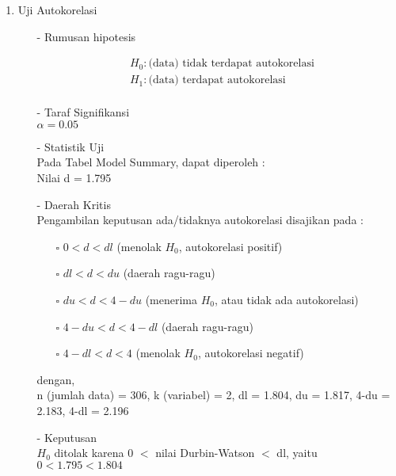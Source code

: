 \begin{enumerate}
\begin{enumerate}
    \item Uji Autokorelasi \\
    \begin{test}{
        \begin{enumerate}
        \item[-] Rumusan hipotesis \\
        \begin{fleqn}[\parindent]
            \begin{equation*}
            \begin{split}
            &H_0 : \text{(data) tidak terdapat autokorelasi} \\ 
            &H_1 : \text{(data) terdapat autokorelasi} \\
            \end{split}
            \end{equation*}
        \end{fleqn}
    
        \item[-] Taraf Signifikansi \\
        $\alpha = 0.05$
    
        \item[-] Statistik Uji \\
        Pada Tabel Model Summary, dapat diperoleh : \\
        Nilai d = 1.795
    
        \item[-] Daerah Kritis \\
        Pengambilan keputusan ada/tidaknya autokorelasi disajikan pada :
        \begin{enumerate}
        \item[$\square$] $0 < d < dl$ (menolak $H_0$, autokorelasi positif)
        \item[$\square$] $dl < d < du$ (daerah ragu-ragu)
        \item[$\square$] $du < d < 4-du$ (menerima $H_0$, atau tidak ada autokorelasi)
        \item[$\square$] $4-du < d < 4-dl$ (daerah ragu-ragu)
        \item[$\square$] $4-dl < d < 4$ (menolak $H_0$, autokorelasi negatif)
        \end{enumerate}
        dengan, \\
        n (jumlah data) = 306, k (variabel) = 2, dl = 1.804, du = 1.817, 4-du = 2.183, 4-dl = 2.196
    
        \item[-] Keputusan \\
        $H_0$ ditolak karena 0 $<$ nilai Durbin-Watson $<$ dl, yaitu $0 < 1.795 < 1.804$
    

\end{enumerate}}
\end{test}
\end{enumerate}
\end{enumerate}
